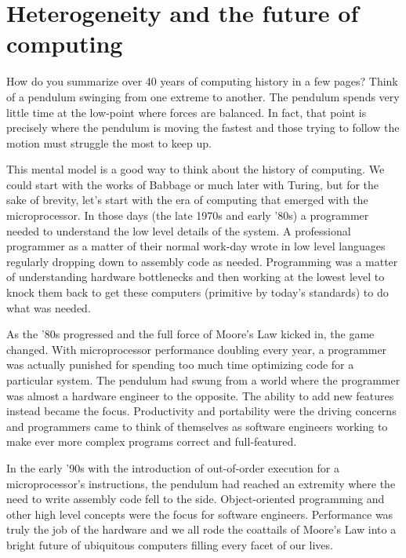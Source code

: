 
\def\ArtDir{01.HeteroComp/figures}%

\chapter{Heterogeneity and the future of computing}
\label{chapter:heterogeneity}

How do you summarize over 40 years of computing history in a few pages?   
Think of a pendulum swinging from one extreme to another.  The pendulum spends very little time at
the low-point where forces are balanced.  In fact, that point is precisely where the pendulum is
moving the fastest and those trying to follow the motion must struggle the most  to keep up.

This mental model is a good way to think about the history of computing.  We could start with the
works of Babbage or much later with Turing, but for the sake of brevity, let's start with the era of computing
that emerged with the microprocessor.  In those days (the late 1970s and early '80s) a programmer
needed to understand the low level details of the system.  A professional programmer as a matter
of their normal work-day wrote in low level languages regularly dropping down to assembly code 
as needed.   Programming was a matter of understanding hardware bottlenecks and then working at the lowest 
level to knock them back to get these computers (primitive by today's standards) to do what was needed.

As the '80s progressed and the full force of Moore's Law kicked in, the game changed.   With
microprocessor performance doubling every year, a programmer was actually punished for 
spending too much time optimizing code for a particular system.  The pendulum had swung from
a world where the programmer was almost a hardware engineer to the opposite.  The ability to 
add new features instead became the focus.  Productivity and portability were the driving concerns and
programmers came to think of themselves as software engineers working to make ever more
complex programs correct and full-featured.

In the early '90s with the introduction of out-of-order execution for a microprocessor's instructions, the 
pendulum had reached an extremity where the need to write assembly code fell to the side.  Object-oriented
programming and other high level concepts were the focus for software engineers.  Performance was
truly the job of the hardware and we all rode the coattails of Moore's Law into a bright future of
ubiquitous computers filling every facet of our lives.

